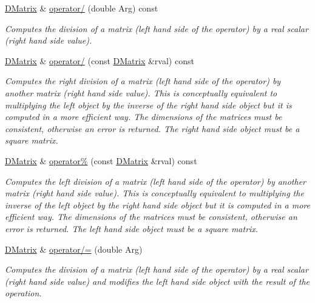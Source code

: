 \begin{DoxyCompactItemize}
\hyperlink{classDMatrix}{DMatrix} \& \hyperlink{classDMatrix_ae58c7f379fbb88acad6b704961f7029c}{operator/} (double Arg) const 
\begin{DoxyCompactList}\small\item\em Computes the division of a matrix (left hand side of the operator) by a real scalar (right hand side value). \item\end{DoxyCompactList}\item 
\hyperlink{classDMatrix}{DMatrix} \& \hyperlink{classDMatrix_a3b8d471ba4ef3cd2e9dc5931e5b77e01}{operator/} (const \hyperlink{classDMatrix}{DMatrix} \&rval) const 
\begin{DoxyCompactList}\small\item\em Computes the right division of a matrix (left hand side of the operator) by another matrix (right hand side value). This is conceptually equivalent to multiplying the left object by the inverse of the right hand side object but it is computed in a more efficient way. The dimensions of the matrices must be consistent, otherwise an error is returned. The right hand side object must be a square matrix. \item\end{DoxyCompactList}\item 
\hyperlink{classDMatrix}{DMatrix} \& \hyperlink{classDMatrix_aa26baf81cd578c80fed72d7b6179ad1f}{operator\%} (const \hyperlink{classDMatrix}{DMatrix} \&rval) const 
\begin{DoxyCompactList}\small\item\em Computes the left division of a matrix (left hand side of the operator) by another matrix (right hand side value). This is conceptually equivalent to multiplying the inverse of the left object by the right hand side object but it is computed in a more efficient way. The dimensions of the matrices must be consistent, otherwise an error is returned. The left hand side object must be a square matrix. \item\end{DoxyCompactList}\item 
\hyperlink{classDMatrix}{DMatrix} \& \hyperlink{classDMatrix_ab57902d452e18ec32edbfb300a59940f}{operator/=} (double Arg)
\begin{DoxyCompactList}\small\item\em Computes the division of a matrix (left hand side of the operator) by a real scalar (right hand side value) and modifies the left hand side object with the result of the operation. \item\end{DoxyCompactList}\item 

\end{DoxyCompactItemize}
